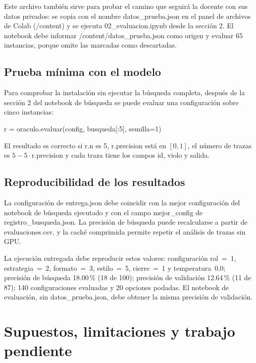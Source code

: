 \documentclass[12pt,letterpaper]{article}
\theoremstyle{definition}
\begin{document}
Este archivo también sirve para probar el camino que seguirá la docente con sus datos privados: se copia con el nombre datos\_prueba.json en el panel de archivos de Colab (/content) y se ejecuta 02\_evaluacion.ipynb desde la sección 2. El notebook debe informar /content/datos\_prueba.json como origen y evaluar 65 instancias, porque omite las marcadas como descartadas.

\subsection{Prueba mínima con el modelo}
Para comprobar la instalación sin ejecutar la búsqueda completa, después de la sección 2 del notebook de búsqueda se puede evaluar una configuración sobre cinco instancias:
\begin{center}
r = oraculo.evaluar(config, busqueda[:5], semilla=1)
\end{center}
El resultado es correcto si r.n es 5, r.precision está en $[0,1]$, el número de trazas es $5 - 5 \cdot \text{r.precision}$ y cada traza tiene los campos id, violo y salida.

\subsection{Reproducibilidad de los resultados}
La configuración de entrega.json debe coincidir con la mejor configuración del notebook de búsqueda ejecutado y con el campo mejor\_config de registro\_busqueda.json. La precisión de búsqueda puede recalcularse a partir de evaluaciones.csv, y la caché comprimida permite repetir el análisis de trazas sin GPU.

La ejecución entregada debe reproducir estos valores: configuración rol~=~1, estrategia~=~2, formato~=~3, estilo~=~5, cierre~=~1 y temperatura~0.0; precisión de búsqueda 18.00\,\% (18 de 100); precisión de validación 12.64\,\% (11 de 87); 140 configuraciones evaluadas y 20 opciones podadas. El notebook de evaluación, sin datos\_prueba.json, debe obtener la misma precisión de validación.

\section{Supuestos, limitaciones y trabajo pendiente}
\end{document}
